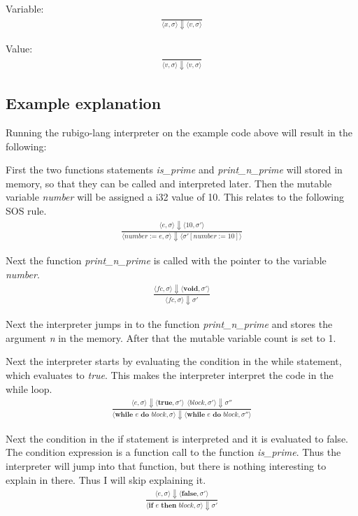 \documentclass[12pt]{article}
\begin{document}
	Variable:
	\begin{align*}
		\frac{}
		{\langle x, \sigma \rangle\Downarrow \langle v, \sigma \rangle}
	\end{align*}

	Value:
	\begin{align*}
		\frac{}
		{\langle v, \sigma \rangle\Downarrow \langle v, \sigma \rangle}
	\end{align*}


    \subsection{Example explanation}
	Running the rubigo-lang interpreter on the example code above will result in the following:

	First the two functions statements \emph{is\_prime} and \emph{print\_n\_prime} will stored in memory, so that they can be called and interpreted later. Then the mutable variable \emph{number} will be assigned a i32 value of 10. This relates to the following SOS rule.
	\begin{align*}
		\frac{\langle e, \sigma \rangle\Downarrow \langle 10, \sigma' \rangle}
		{\langle number := e, \sigma \rangle\Downarrow \langle \sigma' [number := 10] \rangle}
	\end{align*}

	Next the function \emph{print\_n\_prime} is called with the pointer to the variable \emph{number}.
	\begin{align*}
		\frac{\langle fc, \sigma \rangle\Downarrow \langle \textbf{void}, \sigma' \rangle}
		{\langle fc, \sigma \rangle\Downarrow \sigma'}
	\end{align*}

	Next the interpreter jumps in to the function \emph{print\_n\_prime} and stores the argument \emph{n} in the memory. After that the mutable variable count is set to 1.

	Next the interpreter starts by evaluating the condition in the while statement, which evaluates to \emph{true}. This makes the interpreter interpret the code in the while loop.
	\begin{align*}
		\frac{\langle e, \sigma \rangle\Downarrow \langle \textbf{true}, \sigma' \rangle \ \
		\langle block, \sigma' \rangle\Downarrow \sigma''}
		{\langle \textbf{while } e \textbf{ do } block, \sigma \rangle\Downarrow \langle \textbf{while } e \textbf{ do } block, \sigma'' \rangle}
	\end{align*}

	Next the condition in the if statement is interpreted and it is evaluated to false. The condition expression is a function call to the function \emph{is\_prime}. Thus the interpreter will jump into that function, but there is nothing interesting to explain in there. Thus I will skip explaining it.
	\begin{align*}
		\frac{\langle e, \sigma \rangle\Downarrow \langle \textbf{false}, \sigma' \rangle}
		{\langle \textbf{if } e \textbf{ then } block, \sigma \rangle\Downarrow \sigma'}
	\end{align*}
\end{document}
